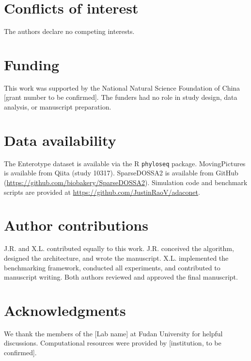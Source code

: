 \documentclass[unnumsec,webpdf,contemporary,large,numbered]{oup-authoring-template}
\theoremstyle{plain}
\theoremstyle{definition}
\begin{document}
\section{Conflicts of interest}
The authors declare no competing interests.

\section{Funding}
This work was supported by the National Natural Science Foundation of China [grant number to be confirmed]. The funders had no role in study design, data analysis, or manuscript preparation.

\section{Data availability}
The Enterotype dataset is available via the R \texttt{phyloseq} package. MovingPictures is available from Qiita (study 10317). SparseDOSSA2 is available from GitHub (\url{https://github.com/biobakery/SparseDOSSA2}). Simulation code and benchmark scripts are provided at \url{https://github.com/JustinRaoV/adaconet}.

\section{Author contributions}
J.R. and X.L. contributed equally to this work. J.R. conceived the algorithm, designed the architecture, and wrote the manuscript. X.L. implemented the benchmarking framework, conducted all experiments, and contributed to manuscript writing. Both authors reviewed and approved the final manuscript.

\section{Acknowledgments}
We thank the members of the [Lab name] at Fudan University for helpful discussions. Computational resources were provided by [institution, to be confirmed].
\end{document}
